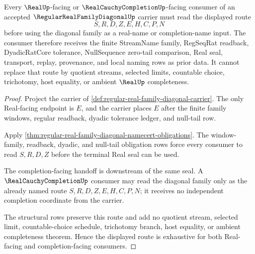 \begin{theorem}
\label{thm:regular-real-family-diagonal-seal-route}
Every $\RealUp$-facing or $\RealCauchyCompletionUp$-facing consumer of an accepted $\RegularRealFamilyDiagonalUp$ carrier must read the displayed route
$$
S,R,D,Z,E,H,C,P,N
$$
before using the diagonal family as a real-name or completion-name input. The consumer therefore receives the finite StreamName family, RegSeqRat readback, DyadicRatCore tolerance, NullSequence zero-tail comparison, Real seal, transport, replay, provenance, and local naming rows as prior data. It cannot replace that route by quotient streams, selected limits, countable choice, trichotomy, host equality, or ambient $\RealUp$ completeness.
\end{theorem}
\begin{proof}
Project the carrier of \autoref{def:regular-real-family-diagonal-carrier}. The only Real-facing endpoint is $E$, and the carrier places $E$ after the finite family windows, regular readback, dyadic tolerance ledger, and null-tail row.

Apply \autoref{thm:regular-real-family-diagonal-namecert-obligations}. The window-family, readback, dyadic, and null-tail obligation rows force every consumer to read $S,R,D,Z$ before the terminal Real seal can be used.

The completion-facing handoff is downstream of the same seal. A $\RealCauchyCompletionUp$ consumer may read the diagonal family only as the already named route $S,R,D,Z,E,H,C,P,N$; it receives no independent completion coordinate from the carrier.

The structural rows preserve this route and add no quotient stream, selected limit, countable-choice schedule, trichotomy branch, host equality, or ambient completeness theorem. Hence the displayed route is exhaustive for both Real-facing and completion-facing consumers.
\end{proof}


